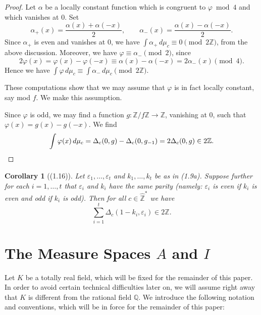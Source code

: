\documentclass[12pt,a4paper]{article}
\theoremstyle{plain}
\newtheorem{corollary}[theorem]{Corollary}
\theoremstyle{definition}
\newcommand{\Z}{\mathbb{Z}}
\newcommand{\Q}{\mathbb{Q}}
\begin{document}
\begin{proof}
Let $\alpha$ be a locally constant function which is congruent to $\varphi\bmod4$ and which vanishes at $0$. Set
\[
\alpha_+(x)=\frac{\alpha(x)+\alpha(-x)}{2},\qquad\alpha_-(x)=\frac{\alpha(x)-\alpha(-x)}{2}.
\]
Since $\alpha_+$ is even and vanishes at $0$, we have $\int\alpha_+\,d\mu_c\equiv0\pmod{2\Z}$, from the above discussion. Moreover, we have $\varphi\equiv\alpha_-\pmod{2}$, since
\[
2\varphi(x)=\varphi(x)-\varphi(-x)\equiv\alpha(x)-\alpha(-x)=2\alpha_-(x)\pmod{4}.
\]
Hence we have $\int\varphi\,d\mu_c\equiv\int\alpha_-\,d\mu_c\pmod{2\Z}$.

These computations show that we may assume that $\varphi$ is in fact locally constant, say mod $f$. We make this assumption.

Since $\varphi$ is odd, we may find a function $g:\Z/f\Z\to\Z$, vanishing at $0$, such that $\varphi(x)=g(x)-g(-x)$. We find
\[
\int\varphi(x)\,d\mu_c=\Delta_c(0,g)-\Delta_c(0,g_{-1})=2\Delta_c(0,g)\in2\Z.\qedhere
\]
\end{proof}

\begin{corollary}[(1.16)]\label{cor:parity-2}
Let $\varepsilon_1,\dots,\varepsilon_t$ and $k_1,\dots,k_t$ be as in (1.9a). Suppose further for each $i=1,\dots,t$ that $\varepsilon_i$ and $k_i$ have the same parity (namely: $\varepsilon_i$ is even if $k_i$ is even and odd if $k_i$ is odd). Then for all $c\in\hat{\Z}^*$ we have
\[
\sum_{i=1}^{t}\Delta_c(1-k_i,\varepsilon_i)\in2\Z.
\]
\end{corollary}

\section{The Measure Spaces $A$ and $I$}

Let $K$ be a totally real field, which will be fixed for the remainder of this paper. In order to avoid certain technical difficulties later on, we will assume right away that $K$ is different from the rational field $\Q$. We introduce the following notation and conventions, which will be in force for the remainder of this paper:
\end{document}
